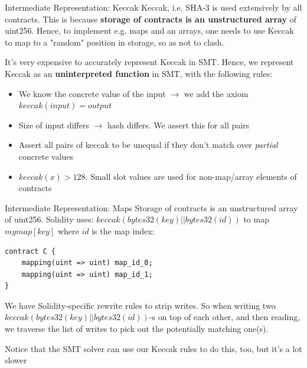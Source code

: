 \documentclass[aspectratio=169]{beamer}
\begin{document}
\begin{frame}[fragile=singleslide]{Intermediate Representation: Keccak}
Keccak, i.e. SHA-3 is used extensively by all contracts. This is because \textbf{storage of contracts is an unstructured array} of uint256. Hence, to implement e.g. maps and an arrays, one needs to use Keccak to map to a "random" position in storage, so as not to clash.
\bigskip

It's very expensive to accurately represent Keccak in SMT. Hence, we represent Keccak as an \textbf{uninterpreted function} in SMT, with the following rules:
\begin{itemize}
\item We know the concrete value of the input $\rightarrow$ we add the axiom $keccak(input)=output$
\item Size of input differs $\rightarrow$ hash differs. We assert this for all pairs
\item Assert all pairs of keccak to be unequal if they don't match over \emph{partial} concrete values
\item $keccak(x) > 128$. Small slot values are used for non-map/array elements of contracts
\end{itemize}
\end{frame}
%
\begin{frame}[fragile=singleslide]{Intermediate Representation: Maps}
Storage of contracts is an unstructured array of uint256. Solidity uses: $keccak (bytes32(key) || bytes32(id))$ to map $mymap[key]$ where $id$ is the map index:

\begin{Verbatim}[frame=single, framerule=0.2mm, framesep=2mm,fontsize=\small]
contract C {
    mapping(uint => uint) map_id_0;
    mapping(uint => uint) map_id_1;
}
\end{Verbatim}
We have Solidity-specific rewrite rules to strip writes. So when writing two $keccak (bytes32(key) || bytes32(id))$-s on top of each other, and then reading, we traverse the list of writes to pick out the potentially matching one(s).
\bigskip

Notice that the SMT solver can use our Keccak rules to do this, too, but it's a lot slower
\end{frame}
\end{document}
